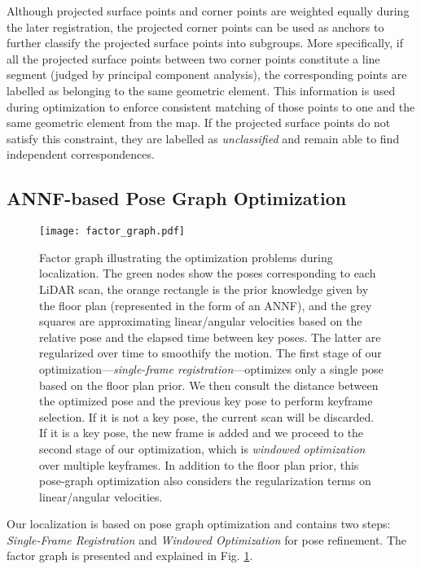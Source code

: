\documentclass[letterpaper, 10 pt, conference]{ieeeconf}  %
\begin{document}
Although projected surface points and corner points are weighted equally during the later registration, the projected corner points can be used as anchors to further classify the projected surface points into subgroups. More specifically, if all the projected surface points between two corner points constitute a line segment (judged by principal component analysis), the corresponding points are labelled as belonging to the same geometric element. This information is used during optimization to enforce consistent matching of those points to one and the same geometric element from the map. If the projected surface points do not satisfy this constraint, they are labelled as \textit{unclassified} and remain able to find independent correspondences.

\subsection{ANNF-based Pose Graph Optimization}
\label{Optimization}

\begin{figure}[t]
  \centering
  \texttt{[image: factor\_graph.pdf]}
  \caption{Factor graph illustrating the optimization problems during localization. The green nodes show the poses corresponding to each LiDAR scan, the orange rectangle is the prior knowledge given by the floor plan (represented in the form of an ANNF), and the grey squares are approximating linear/angular velocities based on the relative pose and the elapsed time between key poses. The latter are regularized over time to smoothify the motion. The first stage of our optimization---\textit{single-frame registration}---optimizes only a single pose based on the floor plan prior. We then consult the distance between the optimized pose and the previous key pose to perform keyframe selection. If it is not a key pose, the current scan will be discarded. If it is a key pose, the new frame is added and we proceed to the second stage of our optimization, which is \textit{windowed optimization} over multiple keyframes. In addition to the floor plan prior, this pose-graph optimization also considers the regularization terms on linear/angular velocities.}
  \label{factor_graph}
\end{figure}

Our localization is based on pose graph optimization and contains two steps: \textit{Single-Frame Registration} and \textit{Windowed Optimization} for pose refinement. The factor graph is presented and explained in Fig. \ref{factor_graph}.
\end{document}

